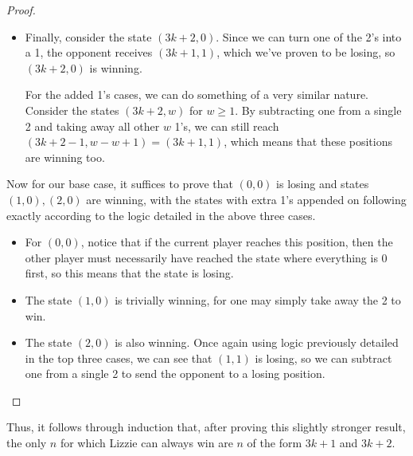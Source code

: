 \begin{solution}{3}
\begin{proof}
\begin{itemize}
            \item Finally, consider the state \( (3k + 2, 0) \). Since we can
                turn one of the 2's into a 1, the opponent receives \( (3k + 1,
                1) \), which we've proven to be losing, so \( (3k + 2, 0) \) is
                winning.

                For the added 1's cases, we can do something of a very similar
                nature. Consider the states \( (3k + 2, w) \) for \( w \ge 1
                \). By subtracting one from a single 2 and taking away all other \(
                w \) 1's, we can still reach \( (3k + 2 - 1, w - w + 1) = (3k +
                1, 1) \), which means that these positions are winning too.
        \end{itemize}
        Now for our base case, it suffices to prove that \( (0, 0) \) is losing
        and states \( (1, 0), (2, 0) \) are winning, with the states with extra
        1's appended on following exactly according to the logic detailed in
        the above three cases.
        \begin{itemize}
            \item For \( (0, 0) \), notice that if the current player reaches
                this position, then the other player must necessarily have
                reached the state where everything is \( 0 \) first, so this
                means that the state is losing.
            \item The state \( (1, 0) \) is trivially winning, for one may
                simply take away the 2 to win.
            \item The state \( (2, 0) \) is also winning. Once again using
                logic previously detailed in the top three cases, we can see
                that \( (1, 1) \) is losing, so we can subtract one from a
                single 2 to send the opponent to a losing position.
        \end{itemize}
    \end{proof}

    Thus, it follows through induction that, after proving this slightly stronger result, the only \( n \) for which Lizzie can always win are \( n \) of the form \( 3k + 1 \) and \( 3k + 2 \).




\end{solution}
